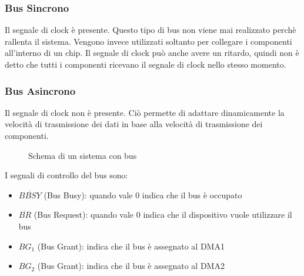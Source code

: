 \documentclass[a4paper]{article}
\theoremstyle{break}
\theoremstyle{break}
\theoremstyle{break}
\theoremstyle{break}
\begin{document}
\subsubsection{Bus Sincrono}
Il segnale di clock è presente. Questo tipo di bus
non viene mai realizzato perchè rallenta il sistema. Vengono invece utilizzati
soltanto per collegare i componenti all'interno di un chip. Il segnale di clock
può anche avere un ritardo, quindi non è detto che tutti i componenti ricevano
il segnale di clock nello stesso momento.

\subsubsection{Bus Asincrono}
Il segnale di clock non è presente. Ciò permette di
adattare dinamicamente la velocità di trasmissione dei dati in base alla
velocità di trasmissione dei componenti.

\begin{figure}[H]
	\centering
	\caption{Schema di un sistema con bus}
\end{figure}

\noindent I segnali di controllo del bus sono:
\begin{itemize}
	\item \( \overline{BBSY} \) (Bus Busy): quando vale 0 indica che il bus è occupato
	\item \( \overline{BR} \) (Bus Request): quando vale 0 indica che il dispositivo vuole
	      utilizzare il bus
	\item \( BG_1 \) (Bus Grant): indica che il bus è assegnato al DMA1
	\item \( BG_2 \) (Bus Grant): indica che il bus è assegnato al DMA2
\end{itemize}
\end{document}
